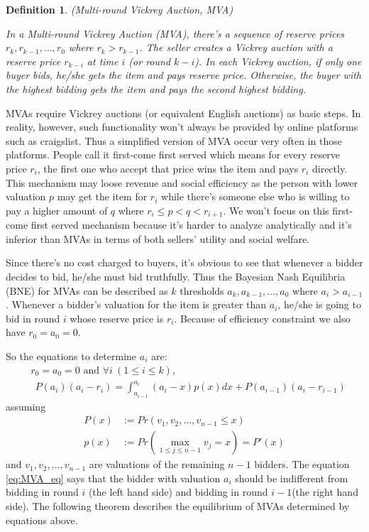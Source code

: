 \documentclass{aamas2012}
\newtheorem{definition}{Definition}
\begin{document}
\begin{definition}(Multi-round Vickrey Auction, MVA)

In a Multi-round Vickrey Auction (MVA), there's a sequence of reserve prices
$r_k, r_{k-1}, \ldots, r_0$ where $r_k > r_{k-1}$. The seller creates a Vickrey
auction with a reserve price $r_{k-i}$ at time $i$ (or round $k-i$). In each
Vickrey auction, if only one buyer bids, he/she gets the item and pays reserve
price. Otherwise, the buyer with the highest bidding gets the item and pays the
second highest bidding.

\end{definition}

MVAs require Vickrey auctions (or equivalent English auctions) as basic steps.
In reality, however, such functionality won't always be provided by online
platforms such as craigslist. Thus a simplified version of MVA occur very often
in those platforms. People call it first-come first served which means for
every reserve price $r_i$, the first one who accept that price wins the item
and pays $r_i$ directly. This mechanism may loose revenue and social efficiency
as the person with lower valuation $p$ may get the item for $r_i$ while there's
someone else who is willing to pay a higher amount of $q$ where $r_i \leq p < q
< r_{i+1}$. We won't focus on this first-come first served mechanism because
it's harder to analyze analytically and it's inferior than MVAs in terms of
both sellers' utility and social welfare.

Since there's no cost charged to buyers, it's obvious to see that whenever a
bidder decides to bid, he/she must bid truthfully. Thus the Bayesian Nash
Equilibria (BNE) for MVAs can be described as $k$ thresholds $a_k, a_{k-1},
\ldots, a_0$ where $a_i > a_{i-1}$. Whenever a bidder's valuation for the item
is greater than $a_i$, he/she is going to bid in round $i$ whose reserve price
is $r_i$. Because of efficiency constraint we also have $r_0 = a_0 = 0$.

So the equations to determine $a_i$ are: 
\begin{align}\label{eq:MVA_eq}
    &r_0 = a_0 = 0 \mbox{ and }
    \forall i ~(1 \leq i \leq k),\nonumber\\
    &~~P(a_{i})(a_{i}-r_i) =
    \int_{a_{i-1}}^{a_{i}}(a_{i}-x)p(x)dx+P(a_{i-1})(a_{i}-r_{i-1})
\end{align}
assuming
\begin{align*}
    P(x) &:= Pr(v_{1},v_{2},\ldots,v_{n-1}\leq x)\\
    p(x) &:= Pr(\max_{1 \leq j\leq n-1}v_{j}=x)=P'(x)
\end{align*}
and $v_1, v_2, \ldots, v_{n-1}$ are valuations of the remaining $n-1$ bidders.
The equation \ref{eq:MVA_eq} says that the bidder with valuation $a_i$ should be
indifferent from bidding in round $i$ (the left hand side) and bidding in round
$i-1$(the right hand side).  The following theorem describes the equilibrium of
MVAs determined by equations above.
\end{document}
